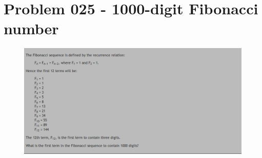 \section{Problem 025 - 1000-digit Fibonacci number}
\begin{prob}
	\begin{figure}[htb!]
		\begin{center}
			\includegraphics[scale = 0.4]{pic/025.png}
		\end{center}
	\end{figure}
\end{prob}
\begin{sol}
\end{sol}